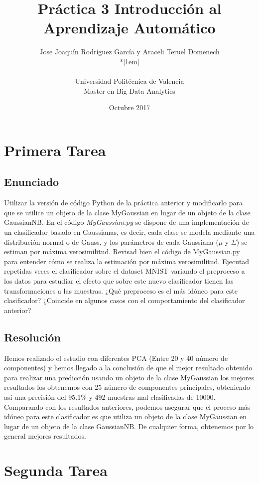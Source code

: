 \documentclass[12pt,twoside]{article}
\title{Práctica 3 Introducción al Aprendizaje Automático}
\author{Jose Joaquín Rodríguez García y Araceli Teruel Domenech\\*[1em]
\begin{minipage}{0.75\textwidth}
\footnotesize \itshape
\begin{center}
Universidad Politécnica de Valencia \\
Master en Big Data Analytics
\end{center}
\end{minipage}
}
\date{Octubre 2017}
\begin{document}
\maketitle


\section{Primera Tarea}

\subsection{Enunciado}

\noindent
Utilizar la versión de código Python de la práctica anterior y modificarlo para que se utilice un objeto de la clase MyGaussian en lugar de un objeto de la clase GaussianNB. En el código \textit{MyGaussian.py} se dispone de una implementación de un clasificador basado en Gaussianas, es decir, cada clase se modela mediante una distribución normal o de Gauss, y los parámetros de cada Gaussiana ($\mu$ y $\Sigma$) se estiman por máxima verosimilitud. Revisad bien el código de MyGaussian.py para entender cómo se realiza la estimación por máxima verosimilitud. Ejecutad repetidas veces el clasificador sobre el dataset MNIST variando el preproceso a los datos para estudiar el efecto que sobre este nuevo clasificador tienen las transformaciones a las muestras. ¿Qué preproceso es el más idóneo para este clasificador? ¿Coincide en algunos casos con el comportamiento del clasificador anterior?


\subsection{Resolución}
Hemos realizado el estudio con diferentes PCA (Entre 20 y 40 número de componentes) y hemos llegado a la conclusión de que el mejor resultado obtenido para realizar una predicción usando un objeto de la clase MyGaussian los mejores resultados los obtenemos con 25 número de componentes principales, obteniendo así una precisión del 95.1\% y 492 muestras mal clasificadas de 10000. \\
Comparando con los resultados anteriores, podemos asegurar que el proceso más idóneo para este clasificador es que utiliza un objeto de la clase MyGaussian en lugar de un objeto de la clase GaussianNB.
De cualquier forma, obtenemos por lo general mejores resultados.



\section{Segunda Tarea}
\end{document}
